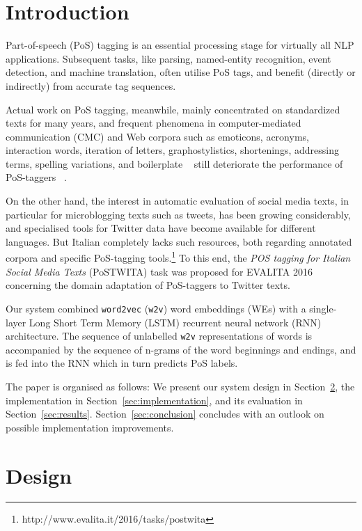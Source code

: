 \documentclass[11pt]{article}
\newcommand\wtv{\texttt{w2v}\xspace}
\begin{document}
\section{Introduction} %
\label{sec:intro}

Part-of-speech (PoS) tagging is an essential processing stage for virtually all
NLP applications.
Subsequent tasks, like parsing, named-entity recognition, event
detection, and machine translation, often utilise PoS tags, and benefit
(directly or indirectly) from accurate tag sequences.

Actual work on PoS tagging, meanwhile, mainly concentrated on standardized
texts for many years, and frequent phenomena in computer-mediated communication
(CMC) and Web corpora such as emoticons, acronyms, interaction words, iteration
of letters, graphostylistics, shortenings, addressing terms, spelling
variations, and boilerplate%
~\cite{androutsopoulos2007,BernardiniBaroniEvert2008,beisswenger2013} still
deteriorate the performance of PoS-taggers%
~\cite{giesbrecht2009,baldwin-EtAl:2013:IJCNLP}.

On the other hand, the interest in automatic evaluation of social media texts,
in particular for microblogging texts such as tweets, has been growing
considerably, and specialised tools for Twitter data have become available for
different languages. 
But Italian completely lacks such resources, both regarding annotated corpora
and specific PoS-tagging tools.\footnote{http://www.evalita.it/2016/tasks/postwita}
To this end, the \emph{POS tagging for Italian Social Media Texts} (PoSTWITA)
task was proposed for EVALITA 2016 concerning the domain adaptation of
PoS-taggers to Twitter texts.

Our system combined \texttt{word2vec} (\wtv) word embeddings (WEs) with a
single-layer Long Short Term Memory (LSTM) recurrent neural network (RNN)
architecture.
The sequence of unlabelled \wtv representations of words is accompanied by
the sequence of n-grams of the word beginnings and endings, and is fed into the
RNN which in turn predicts PoS labels.

The paper is organised as follows: We present our system design in
Section~\ref{sec:design}, the implementation in
Section~\ref{sec:implementation}, and its evaluation in
Section~\ref{sec:results}. 
Section~\ref{sec:conclusion} concludes with an outlook on possible
implementation improvements.

\section{Design} %
\label{sec:design}
\end{document}
